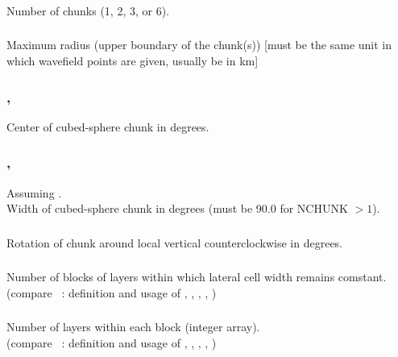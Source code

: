 \subsubsection{} %
Number of chunks (1, 2, 3, or 6).
\subsubsection{} 
Maximum radius (upper boundary of the chunk(s)) [must be the same unit in which wavefield points are given, usually be in km]
\subsubsection{, } 
Center of cubed-sphere chunk in degrees.
\subsubsection{, } 
Assuming .\\
Width of cubed-sphere chunk in degrees (must be 90.0 for NCHUNK $> 1$).
\subsubsection{} 
Rotation of chunk around local vertical counterclockwise in degrees.
\subsubsection{}
Number of blocks of layers within which lateral cell width remains comstant.\\
(compare ~: definition and usage of , 
, , , )
\subsubsection{}
Number of layers within each block (integer array).\\
(compare ~: definition and usage of , 
, , , )
